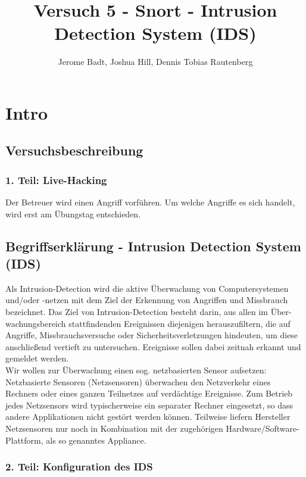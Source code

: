 \documentclass[a4paper]{report}
\title{Versuch 5 - Snort - Intrusion Detection System (IDS)}
\author{Jerome Badt, Joshua Hill, Dennis Tobias Rautenberg}
\begin{document}
\maketitle

\chapter{Intro}

\section{Versuchsbeschreibung}
\subsection{1. Teil: Live-Hacking}
Der Betreuer wird einen Angriff vorführen. Um welche Angriffe es sich handelt, wird erst
am Übungstag entschieden.

\section{Begriffserklärung -  Intrusion Detection System (IDS)}
Als Intrusion-Detection wird die aktive Überwachung von Computersystemen und/oder
-netzen mit dem Ziel der Erkennung von Angriffen und Missbrauch bezeichnet. Das Ziel
von Intrusion-Detection besteht darin, aus allen im Über-wachungsbereich stattfindenden
Ereignissen diejenigen herauszufiltern, die auf Angriffe, Missbrauchsversuche oder
Sicherheitsverletzungen hindeuten, um diese anschließend vertieft zu untersuchen.
Ereignisse sollen dabei zeitnah erkannt und gemeldet werden.\\
Wir wollen zur Überwachung einen sog. netzbasierten Sensor aufsetzen: Netzbasierte
Sensoren (Netzsensoren) überwachen den Netzverkehr eines Rechners oder eines
ganzen Teilnetzes auf verdächtige Ereignisse. Zum Betrieb jedes Netzsensors wird
typischerweise ein separater Rechner eingesetzt, so dass andere Applikationen nicht
gestört werden können. Teilweise liefern Hersteller Netzsensoren nur noch in Kombination
mit der zugehörigen Hardware/Software-Plattform, als so genanntes Appliance.

\subsection{2. Teil: Konfiguration des IDS}
\end{document}
